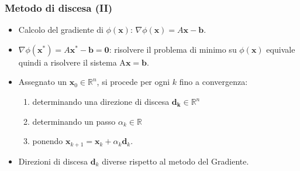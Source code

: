 \documentclass[10pt]{beamer}
\begin{document}
\begin{frame} \frametitle{Metodo di discesa (II)}
 \begin{itemize}
 \item Calcolo del gradiente di $\phi(\mathbf{x})$: $\nabla\phi(\mathbf{x}) = A\mathbf{x}-\mathbf{b}$.
 
 \item $\nabla \phi(\mathbf{x}^{\ast})=A\mathbf{x}^{\ast}-\mathbf{b}=\mathbf{0}$: risolvere il problema di minimo su $\phi(\mathbf{x})$ \alert{equivale} quindi a risolvere il sistema A$\mathbf{x}=\mathbf{b}$.

 \item Assegnato un $\mathbf{x}_0\in \mathbb{R}^n$, si procede per ogni $\mathit{k}$ fino a convergenza:
    \begin{enumerate}
        \item determinando una direzione di discesa $\mathbf{d_k} \in \mathbb{R}^n$
        \item determinando un passo $\alpha_k\in \mathbb{R}$
        \item ponendo $\mathbf{x}_{k+1}=\mathbf{x}_{k}+\alpha_k\mathbf{d}_{k}.$
    \end{enumerate}
    

    \item Direzioni di discesa $\mathbf{d}_k$ diverse rispetto al metodo del Gradiente.
        

\end{itemize}
\end{frame}
\end{document}
